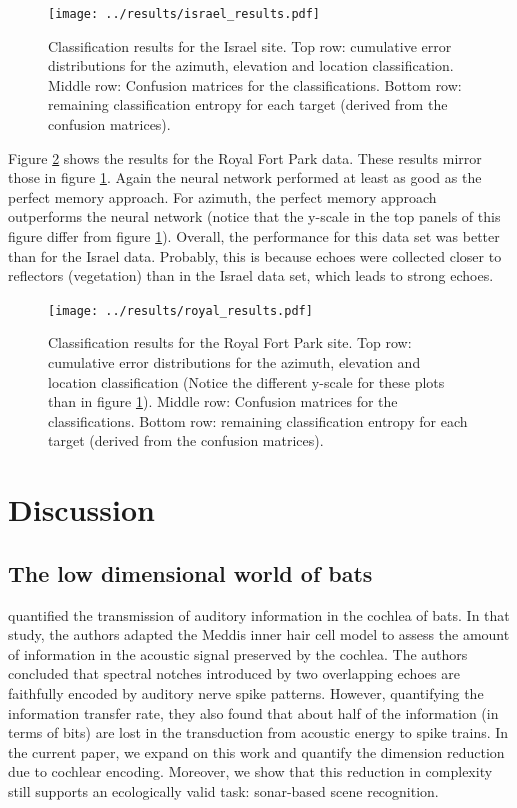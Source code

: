 \documentclass[preprint,5p]{elsarticle}
\begin{document}
\begin{figure}
	\centering
	\texttt{[image: ../results/israel\_results.pdf]}
	\caption{Classification results for the Israel site. Top row: cumulative error distributions for the azimuth, elevation and location classification. Middle row: Confusion matrices for the classifications. Bottom row: remaining classification entropy for each target (derived from the confusion matrices).}
	\label{fig:israelperformance}
\end{figure}


Figure \ref{fig:royalperformance} shows the results for the Royal Fort Park data. These results mirror those in figure \ref{fig:israelperformance}. Again the neural network performed at least as good as the perfect memory approach. For azimuth, the perfect memory approach outperforms the neural network (notice that the y-scale in the top panels of this figure differ from figure \ref{fig:israelperformance}). Overall, the performance for this data set was better than for the Israel data. Probably, this is because echoes were collected closer to reflectors (vegetation) than in the Israel data set, which leads to strong echoes.

\begin{figure}
	\centering
	\texttt{[image: ../results/royal\_results.pdf]}
	\caption{Classification results for the Royal Fort Park site. Top row: cumulative error distributions for the azimuth, elevation and location classification (Notice the different y-scale for these plots than in figure \ref{fig:israelperformance}). Middle row: Confusion matrices for the classifications. Bottom row: remaining classification entropy for each target (derived from the confusion matrices).}
	\label{fig:royalperformance}
\end{figure}


\section{Discussion}

\subsection{The low dimensional world of bats}

\citet{Reijniers2010a} quantified the transmission of auditory information in the cochlea of bats. In that study, the authors adapted the Meddis inner hair cell model \citep{Meddis2006} to assess the amount of information in the acoustic signal preserved by the cochlea. The authors concluded that spectral notches introduced by two overlapping echoes are faithfully encoded by auditory nerve spike patterns. However, quantifying the information transfer rate, they also found that about half of the information (in terms of bits) are lost in the transduction from acoustic energy to spike trains. In the current paper, we expand on this work and quantify the dimension reduction due to cochlear encoding. Moreover, we show that this reduction in complexity still supports an ecologically valid task: sonar-based scene recognition.
\end{document}
